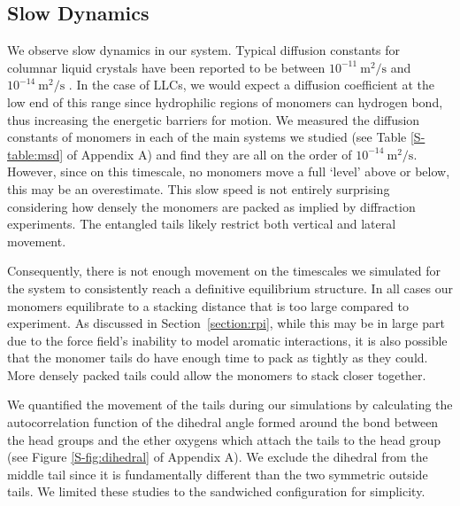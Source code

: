   \subsection{Slow Dynamics}\label{section:slow_dynamics}
  
  We observe slow dynamics in our system. Typical diffusion constants for
  columnar liquid crystals have been reported to be between $10^{-11}~
  \mathrm{m}^2/\mathrm{s}$ \cite{dong_translational_1984} and
  $10^{-14}~\mathrm{m}^2/\mathrm{s}$ \cite{dvinskikh_molecular_2002}.  In the
  case of LLCs, we would expect a diffusion coefficient at the low end of this
  range since hydrophilic regions of monomers can hydrogen bond, thus increasing
  the energetic barriers for motion. We measured the diffusion constants of
  monomers in each of the main systems we studied (see Table \ref{S-table:msd} of
  Appendix A) and find they are all on the order of
  $10^{-14}~\mathrm{m}^2/\mathrm{s}$. However, since on this timescale, no
  monomers move a full `level' above or below, this may be an overestimate. This
  slow speed is not entirely surprising considering how densely the monomers are
  packed as implied by diffraction experiments. The entangled tails likely
  restrict both vertical and lateral movement.

  Consequently, there is not enough movement on the timescales we simulated for
  the system to consistently reach a definitive equilibrium structure. In all
  cases our monomers equilibrate to a stacking distance that is too large
  compared to experiment.  As discussed in Section~\ref{section:rpi}, while this
  may be in large part due to the force field's inability to model aromatic
  interactions, it is also possible that the monomer tails do have enough time to
  pack as tightly as they could. More densely packed tails could allow the
  monomers to stack closer together. 
  
  We quantified the movement of the tails during our simulations by calculating the 
  autocorrelation function of the dihedral angle formed around the bond between the 
  head groups and the ether oxygens which attach the tails to the head group 
  (see Figure \ref{S-fig:dihedral} of Appendix A). We exclude the dihedral from the middle tail 
  since it is fundamentally different than the two symmetric outside tails. We 
  limited these studies to the sandwiched configuration for simplicity.
  
